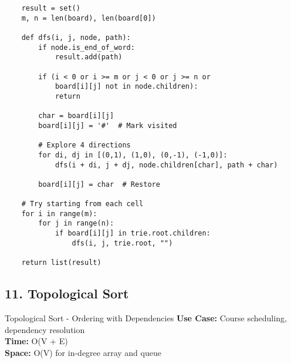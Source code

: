 \documentclass[10pt,a4paper]{article}
\begin{document}
\begin{lstlisting}
    result = set()
    m, n = len(board), len(board[0])

    def dfs(i, j, node, path):
        if node.is_end_of_word:
            result.add(path)

        if (i < 0 or i >= m or j < 0 or j >= n or
            board[i][j] not in node.children):
            return

        char = board[i][j]
        board[i][j] = '#'  # Mark visited

        # Explore 4 directions
        for di, dj in [(0,1), (1,0), (0,-1), (-1,0)]:
            dfs(i + di, j + dj, node.children[char], path + char)

        board[i][j] = char  # Restore

    # Try starting from each cell
    for i in range(m):
        for j in range(n):
            if board[i][j] in trie.root.children:
                dfs(i, j, trie.root, "")

    return list(result)
\end{lstlisting}

\subsection{11. Topological Sort}

\begin{patternbox}{Topological Sort - Ordering with Dependencies}
\textbf{Use Case:} Course scheduling, dependency resolution\\
\textbf{Time:} O(V + E)\\
\textbf{Space:} O(V) for in-degree array and queue
\end{patternbox}
\end{document}
